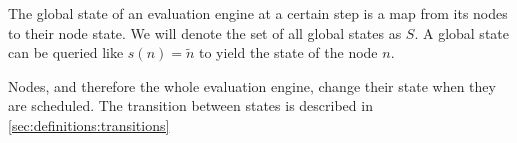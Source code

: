 The global state of an evaluation engine at a certain step is a map from its nodes to their node state.
We will denote the set of all global states as \(S\).
A global state can be queried like \(s(n) = \widetilde{n}\) to yield the state of the node \(n\).

Nodes, and therefore the whole evaluation engine, change their state when they are scheduled.
The transition between states is described in \cref{sec:definitions:transitions}



